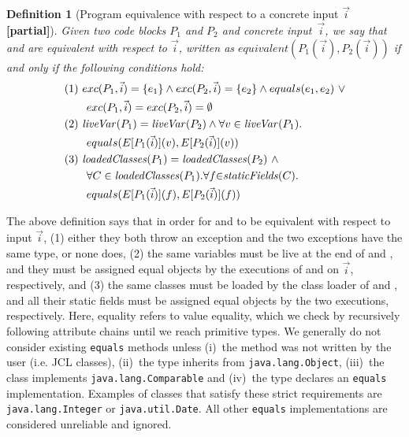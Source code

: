\documentclass[10pt,conference]{IEEEtran}
\newtheorem{definition}{Definition}
\begin{document}
\begin{definition}[Program equivalence with respect to a concrete input $\vec{i}$ {\bf[partial]}]\label{def:prog-equiv}
  Given two code blocks $P_1$ and $P_2$ and concrete input~$\vec{i}$,
  we say that  and  are equivalent
  with respect to $\vec{i}$, written as $equivalent(P_1(\vec{i}), P_2(\vec{i}))$
  if and only if the following conditions hold:
%
\[
\begin{aligned}
  & (1)~ exc(P_1, \vec{i})=\{e_1\} \wedge exc(P_2, \vec{i})=\{e_2\} \wedge equals(e_1,e_2) ~\vee\\
  & \qquad exc(P_1, \vec{i})=exc(P_2, \vec{i}) =\emptyset \\ 
      & (2)~ \mathit{{liveVar}}(P_1) = \mathit{{liveVar}}(P_2) \wedge \forall v\in \mathit{{liveVar}}(P_1). \\
      & \qquad equals(E[P_1(\vec{i})](v), E[P_2(\vec{i})](v))\\
  & (3)~  \mathit{{loadedClasses}}(P_1) = \mathit{{loadedClasses}}(P_2) ~\wedge\\
  & \qquad \forall C \in \mathit{{loadedClasses}}(P_1). \forall f {\in} \mathit{{staticFields}}(C).\\
  & \qquad equals(E[P_1(\vec{i})](f), E[P_2(\vec{i})](f))
    \end{aligned}
    \]
   
  \end{definition}

The above definition says that in order for  and
 to be equivalent with respect to input $\vec{i}$,
(1) either they both throw an exception and the two exceptions have the same type, or none does,
(2) the same variables must be live at the end of  and , and they must be
assigned equal objects by the executions of  and
 on $\vec{i}$, respectively, and
(3) the same classes must be loaded by the class loader of  and , and
all their static fields must be assigned equal objects by the
two executions, respectively.  Here, equality refers
to value equality, which we
check by recursively following attribute chains until we reach
primitive types.  We generally do not consider existing \texttt{equals} methods
unless (i)~the method was not written by the user (i.e.  JCL classes),
(ii)~the type inherits from \texttt{java.lang.Object}, (iii)~the class
implements \texttt{java.lang.Comparable} and (iv)~the type declares an
\texttt{equals} implementation.  Examples of classes that satisfy these
strict requirements are \texttt{java.lang.Integer} or
\texttt{java.util.Date}.  All other \texttt{equals} implementations are
considered unreliable and ignored.
\end{document}
